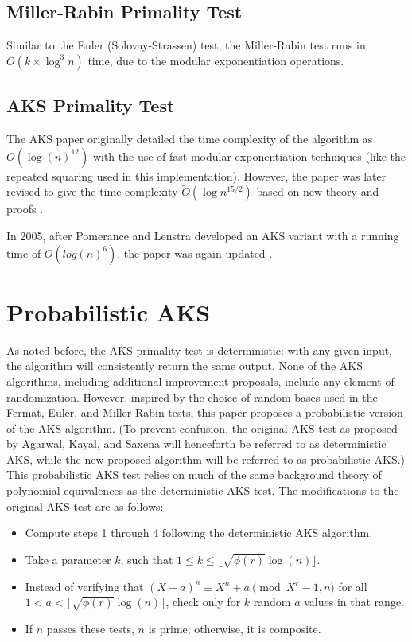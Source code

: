 \documentclass{article}
\begin{document}
\subsection{Miller-Rabin Primality Test}
Similar to the Euler (Solovay-Strassen) test, the Miller-Rabin test runs in $O(k \times \log^3{n})$ time, due to the modular exponentiation operations.

\subsection{AKS Primality Test}
The AKS paper originally detailed the time complexity of the algorithm as $\widetilde{O}(\log(n)^{12})$ with the use of fast modular exponentiation techniques (like the repeated squaring used in this implementation). However, the paper was later revised to give the time complexity $\widetilde{O}(\log{n}^{15/2})$ based on new theory and proofs \cite{agrawal_primes_2004}.

In 2005, after Pomerance and Lenstra developed an AKS variant with a running time of $\widetilde{O}(log(n)^{6})$, the paper was again updated \cite{lenstra_jr._primality_2005}.

\section{Probabilistic AKS}
\label{paks}

As noted before, the AKS primality test is deterministic: with any given input, the algorithm will consistently return the same output. None of the AKS algorithms, including additional improvement proposals, include any element of randomization. However, inspired by the choice of random bases used in the Fermat, Euler, and Miller-Rabin tests, this paper proposes a probabilistic version of the AKS algorithm. (To prevent confusion, the original AKS test as proposed by Agarwal, Kayal, and Saxena will henceforth be referred to as deterministic AKS, while the new proposed algorithm will be referred to as probabilistic AKS.) This probabilistic AKS test relies on much of the same background theory of polynomial equivalences as the deterministic AKS test. The modifications to the original AKS test are as follows:

\begin{itemize}
    \item Compute steps 1 through 4 following the deterministic AKS algorithm.
    \item Take a parameter $k$, such that $1 \leq k \leq \lfloor \sqrt{\phi(r)}\log(n) \rfloor$.
    \item Instead of verifying that $(X + a)^n \equiv X^n + a \pmod{X^r - 1, n}$ for all $1 < a < \lfloor \sqrt{\phi(r)}\log(n) \rfloor$, check only for $k$ random $a$ values in that range.
    \item If $n$ passes these tests, $n$ is prime; otherwise, it is composite.
\end{itemize}
\end{document}
